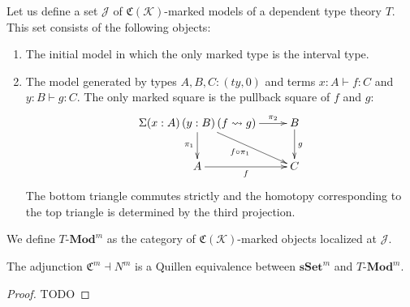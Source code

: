 \documentclass[reqno]{amsart}
\theoremstyle{definition}
\theoremstyle{remark}
\newcommand{\idtype}{\rightsquigarrow}
\newcommand{\cat}[1]{\mathbf{#1}}
\newcommand{\Mod}[1]{#1\text{-}\cat{Mod}}
\newcommand{\sSet}{\cat{sSet}}
\numberwithin{figure}{section}
\begin{document}
Let us define a set $\mathcal{J}$ of $\mathfrak{C}(\mathcal{K})$-marked models of a dependent type theory $T$.
This set consists of the following objects:
\begin{enumerate}
\item The initial model in which the only marked type is the interval type.
\item The model generated by types $A,B,C : (ty,0)$ and terms $x : A \vdash f : C$ and $y : B \vdash g : C$.
The only marked square is the pullback square of $f$ and $g$:
\[ \xymatrix{ \Sigma (x : A)\,(y : B)\,(f \idtype g) \ar[r]^-{\pi_2} \ar[d]_{\pi_1} \ar[dr]_{f \circ \pi_1} & B \ar[d]^g \\
              A \ar[r]_f                                                                                    & C
            } \]
The bottom triangle commutes strictly and the homotopy corresponding to the top triangle is determined by the third projection.
\end{enumerate}
We define $\Mod{T}^m$ as the category of $\mathfrak{C}(\mathcal{K})$-marked objects localized at $\mathcal{J}$.

\begin{thm}
The adjunction $\mathfrak{C}^m \dashv N^m$ is a Quillen equivalence between $\sSet^m$ and $\Mod{T}^m$.
\end{thm}
\begin{proof}
TODO
\end{proof}



\end{document}
